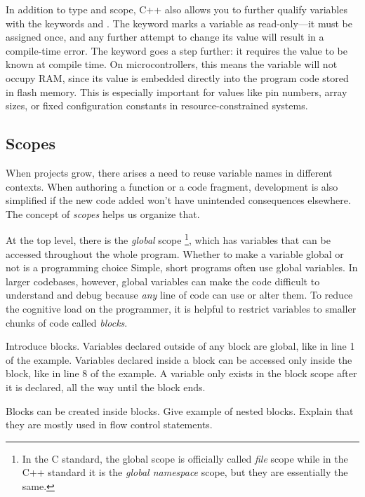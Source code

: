 In addition to type and scope, C++ also allows you to further qualify variables with the keywords  and . 
The  keyword marks a variable as read-only---it must be assigned once, and any further attempt to change its value will result in a compile-time error.
The  keyword goes a step further: it requires the value to be known at compile time. 
On microcontrollers, this means the variable will not occupy RAM, since its value is embedded directly into the program code stored in flash memory. 
This is especially important for values like pin numbers, array sizes, or fixed configuration constants in resource-constrained systems.

\subsection{Scopes}
When projects grow, there arises a need to reuse variable names in different contexts.
When authoring a function or a code fragment, development is also simplified if the new code added won't have unintended consequences elsewhere.
The concept of \emph{scopes} helps us organize that.

At the top level, there is the \emph{global} scope%
\footnote{%
  In the C standard, the global scope is officially called \emph{file} scope while in the C++ standard it is the \emph{global namespace} scope, but they are essentially the same. \cneed
}, which has variables that can be accessed throughout the whole program.
Whether to make a variable global or not is a programming choice
Simple, short programs often use global variables.
In larger codebases, however, global variables can make the code difficult to understand and debug because \emph{any} line of code can use or alter them.
To reduce the cognitive load on the programmer, it is helpful to restrict variables to smaller chunks of code called \emph{blocks}.


\pending{}
Introduce blocks.
Variables declared outside of any block are global, like in line 1 of the example.
Variables declared inside a block can be accessed only inside the block, like in line 8 of the example.
A variable only exists in the block scope after it is declared, all the way until the block ends.

\pending{}
Blocks can be created inside blocks.
Give example of nested blocks.
Explain that they are mostly used in flow control statements.

